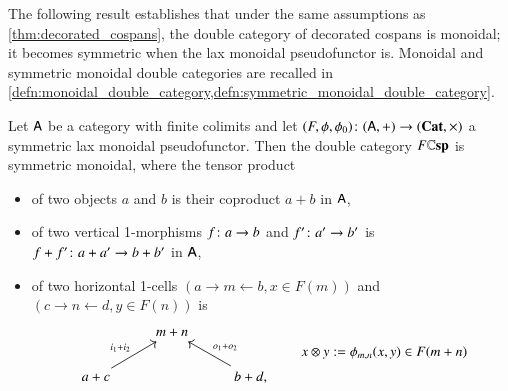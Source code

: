 \documentclass[reqno]{amsart}
\begin{document}
The following result establishes that under the same assumptions as \cref{thm:decorated_cospans}, the double category of decorated cospans is monoidal; it becomes symmetric when the lax monoidal pseudofunctor is.  Monoidal and symmetric monoidal double categories are recalled in \cref{defn:monoidal_double_category,defn:symmetric_monoidal_double_category}.

\begin{thm}\label{DC}
Let $\mathsf{A}$ be a category with finite colimits and let $(F,\phi,\phi_0)\colon (\mathsf{A},+) \to (\mathbf{Cat},\times)$ a symmetric lax monoidal pseudofunctor. Then the double category $F\mathbf{\mathbb Csp}$ is symmetric monoidal, where the tensor product
\begin{itemize}
\item of two objects $a$ and $b$ is their coproduct $a+b$ in $\mathsf{A}$,
\item of two vertical 1-morphisms $f \colon a \to b$ and $f' \colon a' \to b'$ is $f+f' \colon a+a' \to b+b'$ in $\mathsf{A}$,
\item of two horizontal 1-cells $(a \to m \leftarrow b ,x \in F(m))$ and $(c \to n \leftarrow d, y\in F(n))$ is
\begin{equation}\label{eq:tensordecoration}
\begin{tikzcd}
& m+n & \\
a+c\ar[ur,"i_1+i_2"] && b+d,\ar[ul,"o_1+o_2"']
\end{tikzcd}\qquad x \otimes y:=  \phi_{m,n}(x,y) \in F(m + n) 
\end{equation}

\begin{comment}
\begin{equation}\label{eq:tensordecoration}
\begin{tikzcd}
& m_1+m_2 & \\
a_1+a_2\ar[ur,"i_1+i_2"] && b_1+b_2,\ar[ul,"o_1+o_2"']
\end{tikzcd}\qquad x_1\otimes x_2:=\one \xrightarrow{x_1\times x_2}F(m_1)\times F(m_2)\xrightarrow{\phi_{m_1,m_2}}F(m_1+m_2)
\end{equation}
\end{comment}


\end{itemize}
\end{thm}
\end{document}
